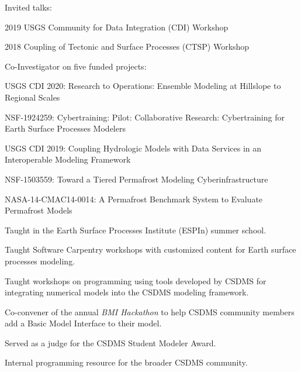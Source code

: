\begin{compactitem}[\itembullet]
  \item Invited talks:
    \begin{compactitem}[\itembullet]
      \item
        2019 USGS Community for Data Integration (CDI) Workshop
      \item
        2018 Coupling of Tectonic and Surface Processes (CTSP)
        Workshop
    \end{compactitem}
  \item Co-Investigator on five funded projects:
    \begin{compactitem}[\itembullet]
      \item
        USGS CDI 2020: Research to Operations: Ensemble Modeling at
        Hillslope to Regional Scales
      \item
        NSF-1924259: Cybertraining: Pilot: Collaborative Research:
        Cybertraining for Earth Surface Processes Modelers
      \item
        USGS CDI 2019: Coupling Hydrologic Models with Data Services
        in an Interoperable Modeling Framework
      \item
        NSF-1503559: Toward a Tiered Permafrost Modeling Cyberinfrastructure
      \item
        NASA-14-CMAC14-0014: A Permafrost Benchmark System to Evaluate
        Permafrost Models
    \end{compactitem}
  \item
    Taught in the Earth Surface Processes Institute (ESPIn) summer school.
  \item
    Taught Software Carpentry workshops with customized content for
    Earth surface processes modeling.
  \item
    Taught workshops on programming using tools developed by CSDMS for
    integrating numerical models into the CSDMS modeling framework.
  \item
    Co-convener of the annual \textit{BMI Hackathon} to help CSDMS
    community members add a Basic Model Interface to their model.
  \item
    Served as a judge for the CSDMS Student Modeler Award.
  \item Internal programming resource for the broader CSDMS community.
\end{compactitem}

